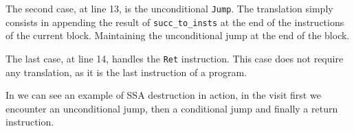 The second case, at line 13, is the unconditional \texttt{Jump}. The translation simply consists in appending the result of \texttt{succ\_to\_insts} at the end of the instructions of the current block. Maintaining the unconditional jump at the end of the block.

The last case, at line 14, handles the \texttt{Ret} instruction. This case does not require any translation, as it is the last instruction of a program.






In  we can see an example of SSA destruction in action, in the visit first we encounter an unconditional jump, then a conditional jump and finally a return instruction.

